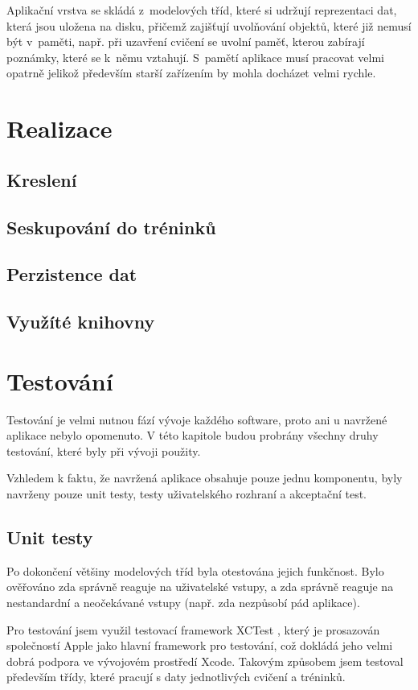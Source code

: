 \documentclass[thesis=B,czech]{FITthesis}[2012/06/26]
\begin{document}
	Aplikační vrstva se skládá z~modelových tříd, které si udržují reprezentaci dat, která jsou uložena na disku, přičemž zajišťují uvolňování objektů, které již nemusí být v~paměti, např. při uzavření cvičení se uvolní paměť, kterou zabírají poznámky, které se k~němu vztahují. S~pamětí aplikace musí pracovat velmi opatrně jelikož především starší zařízením by mohla docházet velmi rychle.

\chapter{Realizace}

	\section{Kreslení}
	\section{Seskupování do tréninků}
	\section{Perzistence dat}
	\section{Využíté knihovny}

\chapter{Testování}

	Testování je velmi nutnou fází vývoje každého software, proto ani u navržené aplikace nebylo opomenuto. V této kapitole budou probrány všechny druhy testování, které byly při vývoji použity.

	Vzhledem k faktu, že navržená aplikace obsahuje pouze jednu komponentu, byly navrženy pouze unit testy, testy uživatelského rozhraní a akceptační test.

\section{Unit testy}

	Po dokončení většiny modelových tříd byla otestována jejich funkčnost. Bylo ověřováno zda správně reaguje na uživatelské vstupy, a zda správně reaguje na nestandardní a neočekávané vstupy (např. zda nezpůsobí pád aplikace).

	Pro testování jsem využil testovací framework XCTest \cite{xctestOnline}, který je prosazován společností Apple jako hlavní framework pro testování, což dokládá jeho velmi dobrá podpora ve vývojovém prostředí Xcode. Takovým způsobem jsem testoval především třídy, které pracují s daty jednotlivých cvičení a tréninků.
\end{document}
